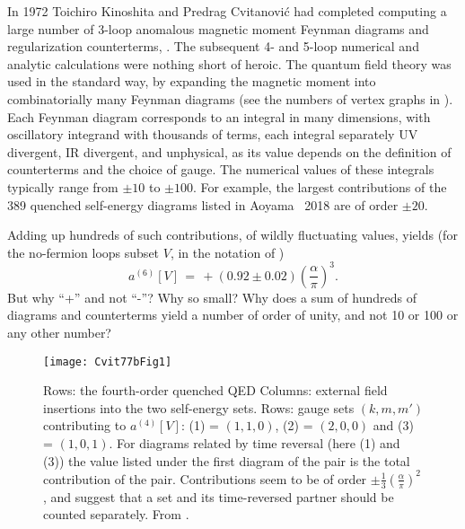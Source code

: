 \noindent
In 1972 Toichiro Kinoshita and Predrag Cvitanovi\'c had completed
computing a large number of 3-loop anomalous magnetic moment Feynman
diagrams and regularization counterterms,
.
The subsequent 4- and 5-loop numerical and analytic calculations were
nothing short of heroic. The
quantum field theory was used in the standard way, by
expanding the magnetic moment into combinatorially many Feynman diagrams
(see the numbers of vertex graphs in ).
Each Feynman diagram corresponds to an integral in many dimensions, with
oscillatory integrand with thousands of terms, each integral separately
UV divergent, IR divergent, and unphysical, as its value depends on the
definition of counterterms and the choice of gauge.
The numerical values of these integrals typically range from  $\pm 10$
to $\pm 100$. For example, the largest contributions of
the 389 quenched self-energy diagrams listed in
Aoyama \etal\ 2018 are of order $\pm 20$.

Adding up hundreds of such contributions, of wildly fluctuating values,
yields (for the no-fermion loops subset $V$, in the notation of
)
\[
 a^{(6)}[V] %
 \,=\, +  (0.92 \pm 0.02) \left(\frac{\alpha}{\pi}\right)^3.
\]
But why ``+'' and not ``-''? Why so small? Why does a sum of hundreds of
diagrams and counterterms yield a number of order of unity, and not 10 or
100 or any other number?

\begin{figure}
\begin{center}
\texttt{[image: Cvit77bFig1]}
\end{center}
\caption{\label{Cvit77bFig1}
Rows: the fourth-order quenched QED
Columns: external field insertions into the two self-energy sets.
Rows: gauge sets
$(k,m,m')$ contributing to $a^{(4)}[V]$: (1) = $(1,1,0)$,
(2) = $(2,0,0)$
and
(3) = $(1,0,1)$.
For diagrams related by time
reversal (here (1) and (3))
the value listed under the first diagram of the pair is
the total contribution of the pair. Contributions seem to be of order
$\pm\frac{1}{3}\left(\frac{\alpha}{\pi}\right)^2$, and suggest that
a set and its time-reversed partner should be counted separately.
From .
}
 \end{figure}

